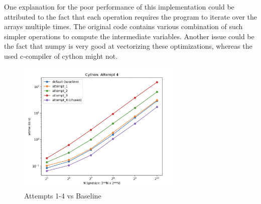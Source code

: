 \documentclass[a4paper,10pt]{article}
\begin{document}
One explanation for the poor performance of this implementation could be attributed to the fact that each operation requires the program to iterate over the arrays multiple times.
The original code contains various combination of such simpler operations to compute the intermediate variables.
Another issue could be the fact that numpy is very good at vectorizing these optimizations, whereas the used c-compiler of cython might not.
\begin{figure}[h]
  \centering
  \includegraphics[width=0.7\textwidth]{images/cython/cython_attempt_4.png}
  \caption{Attempts 1-4 vs Baseline}
  \label{fig:cython_attempts}
\end{figure}

    
\end{document}
